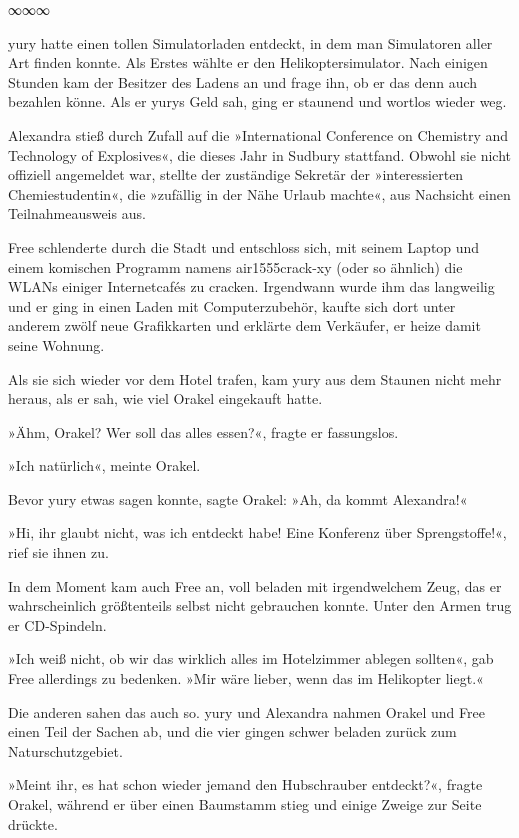 \begin{center}
    ∞∞∞
\end{center}

yury hatte einen tollen Simulatorladen entdeckt, in dem man Simulatoren aller Art finden konnte. Als Erstes wählte er den Helikoptersimulator. Nach einigen Stunden kam der Besitzer des Ladens an und frage ihn, ob er das denn auch bezahlen könne. Als er yurys Geld sah, ging er staunend und wortlos wieder weg.

Alexandra stieß durch Zufall auf die »International Conference on Chemistry and Technology of Explosives«, die dieses Jahr in Sudbury stattfand. Obwohl sie nicht offiziell angemeldet war, stellte der zuständige Sekretär der »interessierten Chemiestudentin«, die »zufällig in der Nähe Urlaub machte«, aus Nachsicht einen Teilnahmeausweis aus.

Free schlenderte durch die Stadt und entschloss sich, mit seinem Laptop und einem komischen Programm namens air1555crack-xy (oder so ähnlich) die WLANs einiger Internetcafés zu cracken. Irgendwann wurde ihm das langweilig und er ging in einen Laden mit Computerzubehör, kaufte sich dort unter anderem zwölf neue Grafikkarten und erklärte dem Verkäufer, er heize damit seine Wohnung.

Als sie sich wieder vor dem Hotel trafen, kam yury aus dem Staunen nicht mehr heraus, als er sah, wie viel Orakel eingekauft hatte.

»Ähm, Orakel? Wer soll das alles essen?«, fragte er fassungslos.

»Ich natürlich«, meinte Orakel.

Bevor yury etwas sagen konnte, sagte Orakel: »Ah, da kommt Alexandra!«

»Hi, ihr glaubt nicht, was ich entdeckt habe! Eine Konferenz über Sprengstoffe!«, rief sie ihnen zu.

In dem Moment kam auch Free an, voll beladen mit irgendwelchem Zeug, das er wahrscheinlich größtenteils selbst nicht gebrauchen konnte. Unter den Armen trug er CD-Spindeln.

»Ich weiß nicht, ob wir das wirklich alles im Hotelzimmer ablegen sollten«, gab Free allerdings zu bedenken. »Mir wäre lieber, wenn das im Helikopter liegt.«

Die anderen sahen das auch so. yury und Alexandra nahmen Orakel und Free einen Teil der Sachen ab, und die vier gingen schwer beladen zurück zum Naturschutzgebiet.

»Meint ihr, es hat schon wieder jemand den Hubschrauber entdeckt?«, fragte Orakel, während er über einen Baumstamm stieg und einige Zweige zur Seite drückte.

